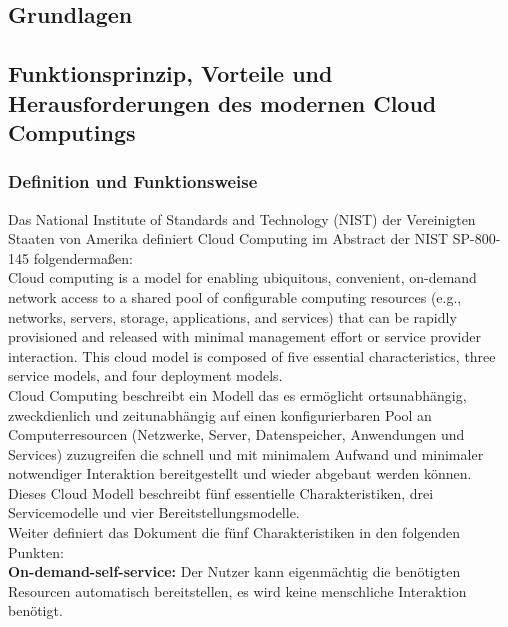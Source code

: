 
\begin{spacing}{1.2}

\chapter{Grundlagen}
\label{sec:grundl}

\section{Funktionsprinzip, Vorteile und Herausforderungen des modernen Cloud Computings}

\subsection{Definition und Funktionsweise}

Das National Institute of Standards and Technology (NIST) der Vereinigten
Staaten von Amerika definiert Cloud Computing im Abstract der NIST SP-800-145
folgendermaßen:\\

Cloud computing is a model for enabling ubiquitous, convenient, on-demand network access to a shared
pool of configurable computing resources (e.g., networks, servers, storage, applications, and services) that
can be rapidly provisioned and released with minimal management effort or service provider interaction.
This cloud model is composed of five essential characteristics, three service models, and four deployment
models.\\

Cloud Computing beschreibt ein Modell das es ermöglicht ortsunabhängig, zweckdienlich und
zeitunabhängig auf einen konfigurierbaren Pool an Computerresourcen (Netzwerke, Server,
Datenspeicher, Anwendungen und Services) zuzugreifen die schnell und mit minimalem
Aufwand und minimaler notwendiger Interaktion bereitgestellt und wieder abgebaut
werden können.
Dieses Cloud Modell beschreibt fünf essentielle Charakteristiken, drei Servicemodelle
und vier Bereitstellungsmodelle.\\

Weiter definiert das Dokument die fünf Charakteristiken in den folgenden Punkten:\\

\textbf{On-demand-self-service:} Der Nutzer kann eigenmächtig die benötigten Resourcen
automatisch bereitstellen, es wird keine menschliche Interaktion benötigt.


\end{spacing}

